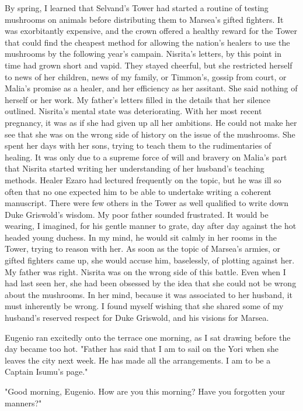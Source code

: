 \documentclass{article}
\begin{document}
By spring, I learned that Selvand's Tower had started a routine of testing mushrooms on animals before distributing them to Marsea's gifted fighters. It was exorbitantly expensive, and the crown offered a healthy reward for the Tower that could find the cheapest method for allowing the nation's healers to use the mushrooms by the following year's campain. Nisrita's letters, by this point in time had grown short and vapid. They stayed cheerful, but she restricted herself to news of her children, news of my family, or Timmon's, gossip from court, or Malia's promise as a healer, and her efficiency as her assitant. She said nothing of herself or her work. My father's letters filled in the details that her silence outlined. Nisrita's mental state was deteriorating. With her most recent pregnancy, it was as if she had given up all her ambitions. He could not make her see that she was on the wrong side of history on the issue of the mushrooms. She spent her days with her sons, trying to teach them to the rudimentaries of healing. It was only due to a supreme force of will and bravery on Malia's part that Nisrita started writing her understanding of her husband's teaching methods. Healer Ezaro had lectured frequently on the topic, but he was ill so often that no one expected him to be able to undertake writing a coherent manuscript. There were few others in the Tower as well qualified to write down Duke Griswold's wisdom. My poor father sounded frustrated. It would be wearing, I imagined, for his gentle manner to grate, day after day against the hot headed young duchess. In my mind, he would sit calmly in her rooms in the Tower, trying to reason with her. As soon as the topic of Marsea's armies, or gifted fighters came up, she would accuse him, baselessly, of plotting against her. My father was right. Nisrita was on the wrong side of this battle. Even when I had last seen her, she had been obsessed by the idea that she could not be wrong about the mushrooms. In her mind, because it was associated to her husband, it must inherently be wrong. I found myself wishing that she shared some of my husband's reserved respect for Duke Griswold, and his visions for Marsea.

Eugenio ran excitedly onto the terrace one morning, as I sat drawing before the day became too hot. "Father has said that I am to sail on the Yori when she leaves the city next week. He has made all the arrangements. I am to be a Captain Isumu's page."

"Good morning, Eugenio. How are you this morning? Have you forgotten your manners?"
\end{document}
